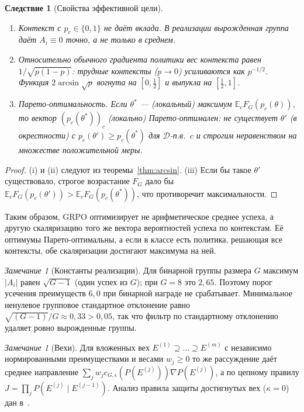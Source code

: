 \documentclass[11pt,a4paper]{article}
\theoremstyle{plain}
\newtheorem{corollary}[theorem]{Следствие}
\theoremstyle{definition}
\theoremstyle{remark}
\newtheorem{remark}[theorem]{Замечание}
\newcommand{\E}{\mathbb{E}}
\newcommand{\cD}{\mathcal{D}}
\begin{document}
\begin{corollary}[Свойства эффективной цели]\label{cor:arcsin}
\begin{enumerate}[label=(\roman*)]
\item Контекст с $p_c\in\{0,1\}$ не даёт вклада. В реализации вырожденная группа даёт $A_i\equiv0$ точно, а не только в среднем.
\item Относительно обычного градиента политики вес контекста равен $1/\sqrt{p(1-p)}$: трудные контексты ($p\to0$) усиливаются как $p^{-1/2}$. Функция $2\arcsin\sqrt p$ вогнута на $[0,\tfrac12]$ и выпукла на $[\tfrac12,1]$.
\item \emph{Парето-оптимальность.} Если $\theta^\ast$ --- (локальный) максимум $\E_cF_G(p_c(\theta))$, то вектор $(p_c(\theta^\ast))_c$ (локально) Парето-оптимален: не существует $\theta'$ (в окрестности) с $p_c(\theta')\ge p_c(\theta^\ast)$ для $\cD$-п.в.\ $c$ и строгим неравенством на множестве положительной меры.
\end{enumerate}
\end{corollary}
\begin{proof}
(i) и (ii) следуют из теоремы~\ref{thm:arcsin}. (iii) Если бы такое $\theta'$ существовало, строгое возрастание $F_G$ дало бы $\E_cF_G(p_c(\theta'))>\E_cF_G(p_c(\theta^\ast))$, что противоречит максимальности.
\end{proof}

Таким образом, GRPO оптимизирует не арифметическое среднее успеха, а другую скаляризацию того же вектора вероятностей успеха по контекстам. Её оптимумы Парето-оптимальны, а если в классе есть политика, решающая все контексты, обе скаляризации достигают максимума на ней.

\begin{remark}[Константы реализации]\label{rem:constants}
Для бинарной группы размера $G$ максимум $|A_i|$ равен $\sqrt{G-1}$ (один успех из $G$); при $G=8$ это $2{,}65$. Поэтому порог усечения преимуществ $6{,}0$ при бинарной награде не срабатывает. Минимальное ненулевое групповое стандартное отклонение равно $\sqrt{(G-1)}/G\approx0{,}33>0{,}05$, так что фильтр по стандартному отклонению удаляет ровно вырожденные группы.
\end{remark}

\begin{remark}[Вехи]
Для вложенных вех $E^{(1)}\supseteq\dots\supseteq E^{(m)}$ с независимо нормированными преимуществами и весами $w_j\ge0$ то же рассуждение даёт среднее направление $\sum_jw_jc_{G,\epsilon}(P(E^{(j)}))\nabla P(E^{(j)})$, а по цепному правилу $J=\prod_j P(E^{(j)}\mid E^{(j-1)})$. Анализ правила защиты достигнутых вех ($\kappa=0$) дан в~\cite[предложение~C]{notes}.
\end{remark}
\end{document}
